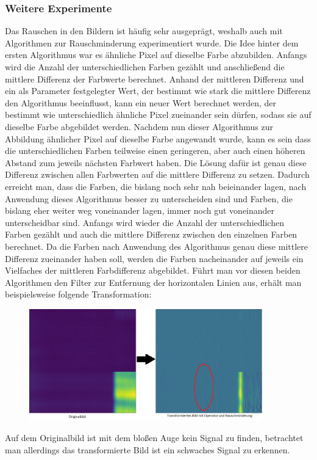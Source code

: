 \documentclass[12pt, a4paper]{article}
\begin{document}
\subsubsection{Weitere Experimente}
Das Rauschen in den Bildern ist häufig sehr ausgeprägt, weshalb auch mit Algorithmen zur Rauschminderung experimentiert wurde. Die Idee hinter dem ersten Algorithmus war es ähnliche Pixel auf dieselbe Farbe abzubilden. Anfangs wird die Anzahl der unterschiedlichen Farben gezählt und anschließend die mittlere Differenz der Farbwerte berechnet. Anhand der mittleren Differenz und ein als Parameter festgelegter Wert, der bestimmt wie stark die mittlere Differenz den Algorithmus beeinflusst, kann ein neuer Wert berechnet werden, der bestimmt wie unterschiedlich ähnliche Pixel zueinander sein dürfen, sodass sie auf dieselbe Farbe abgebildet werden. 
\newline
Nachdem nun dieser Algorithmus zur Abbildung ähnlicher Pixel auf dieselbe Farbe angewandt wurde, kann es sein dass die unterschiedlichen Farben teilweise einen geringeren, aber auch einen höheren Abstand zum jeweils nächsten Farbwert haben. Die Lösung dafür ist genau diese Differenz zwischen allen Farbwerten auf die mittlere Differenz zu setzen. Dadurch erreicht man, dass die Farben, die bislang noch sehr nah beieinander lagen, nach Anwendung dieses Algorithmus besser zu unterscheiden sind und Farben, die bislang eher weiter weg voneinander lagen, immer noch gut voneinander unterscheidbar sind. Anfangs wird wieder die Anzahl der unterschiedlichen Farben gezählt und auch die mittlere Differenz zwischen den einzelnen Farben berechnet. Da die Farben nach Anwendung des Algorithmus genau diese mittlere Differenz zueinander haben soll, werden die Farben nacheinander auf jeweils ein Vielfaches der mittleren Farbdifferenz abgebildet.
\newline
Führt man vor diesen beiden Algorithmen den Filter zur Entfernung der horizontalen Linien aus, erhält man beispielsweise folgende Transformation:
\begin{figure}[h]
\centering
\includegraphics[width=0.9\textwidth]{img/original-vs-rauschminderung.png}
\end{figure}
\newline
Auf dem Originalbild ist mit dem bloßen Auge kein Signal zu finden, betrachtet man allerdings das transformierte Bild ist ein schwaches Signal zu erkennen.
\end{document}
